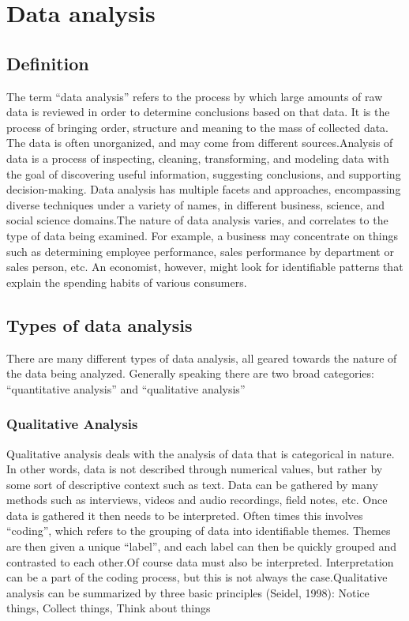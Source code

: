 \documentclass[a4paper,12pt,oneside]{report}
\begin{document}
{{\section{Data analysis}
\subsection{Definition}
{      The term “data analysis” refers to the process by which large amounts of raw data is reviewed in order to determine conclusions based on that data. It is the process of bringing order, structure and meaning to the mass of collected data. The data is often unorganized, and may come from different sources.Analysis of data is a process of inspecting, cleaning, transforming, and modeling data with the goal of discovering useful information, suggesting conclusions, and supporting decision-making. Data analysis has multiple facets and approaches, encompassing diverse techniques under a variety of names, in different business, science, and social science domains.The nature of data analysis varies, and correlates to the type of data being examined. For example, a business may concentrate on things such as determining employee performance, sales performance by department or sales person, etc. An economist, however, might look for identifiable patterns that explain the spending habits of various consumers.}
\subsection{Types of data analysis }
{     There are many different types of data analysis, all geared towards the nature of the data being analyzed. Generally speaking there are two broad categories: “quantitative analysis” and “qualitative analysis”}
\subsubsection{Qualitative Analysis}
{    Qualitative analysis deals with the analysis of data that is categorical in nature. In other words, data is not described through numerical values, but rather by some sort of descriptive context such as text. Data can be gathered by many methods such as interviews, videos and audio recordings, field notes, etc.
Once data is gathered it then needs to be interpreted. Often times this involves “coding”, which refers to the grouping of data into identifiable themes. Themes are then given a unique “label”, and each label can then be quickly grouped and contrasted to each other.Of course data must also be interpreted. Interpretation can be a part of the coding process, but this is not always the case.Qualitative analysis can be summarized by three basic principles (Seidel, 1998):
Notice things, Collect things, Think about things}
}}
\end{document}
